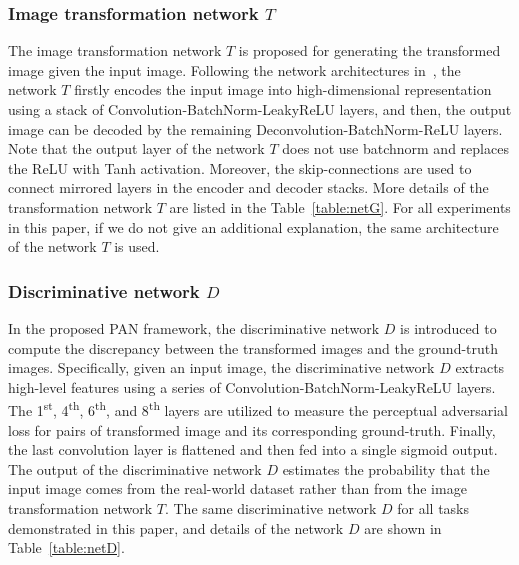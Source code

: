\documentclass{article}
\begin{document}
\subsubsection{Image transformation network $T$}
The image transformation network $T$ is proposed for generating the transformed image given the input image. Following the network architectures in~\cite{radford2015unsupervised,isola2016image}, the network $T$ firstly encodes the input image into high-dimensional representation using a stack of Convolution-BatchNorm-LeakyReLU layers, and then, the output image can be decoded by the remaining Deconvolution-BatchNorm-ReLU layers. Note that the output layer of the network $T$ does not use batchnorm and replaces the ReLU with Tanh activation. Moreover, the skip-connections are used to connect mirrored layers in the encoder and decoder stacks. More details of the transformation network $T$ are listed in the Table~\ref{table:netG}. For all experiments in this paper, if we do not give an additional explanation, the same architecture of the network $T$ is used.

\subsubsection{Discriminative network $D$}
In the proposed PAN framework, the discriminative network $D$ is introduced to compute the discrepancy between the transformed images and the ground-truth images. Specifically, given an input image, the discriminative network $D$ extracts high-level features using a series of Convolution-BatchNorm-LeakyReLU layers. The 1\textsuperscript{st}, 4\textsuperscript{th}, 6\textsuperscript{th}, and 8\textsuperscript{th} layers are utilized to measure the perceptual adversarial loss for pairs of transformed image and its corresponding ground-truth. Finally, the last convolution layer is flattened and then fed into a single sigmoid output. The output of the discriminative network $D$ estimates the probability that the input image comes from the real-world dataset rather than from the image transformation network $T$. 
The same discriminative network $D$ for all tasks demonstrated in this paper, and details of the network $D$ are shown in Table~\ref{table:netD}.
\end{document}
